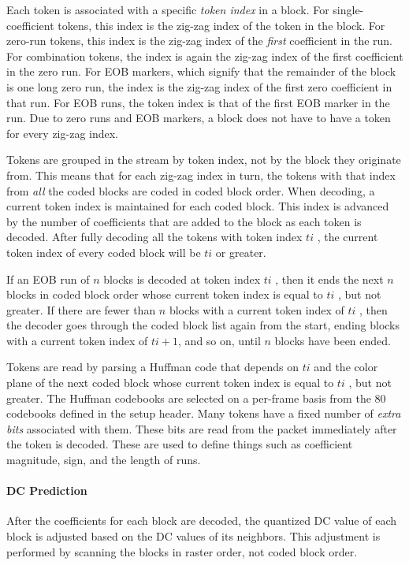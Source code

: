 \documentclass[11pt,letterpaper]{article}
\newcommand{\ti}{\ensuremath{\mathit{ti}} }
\newcommand{\term}[1]{{\em #1}}
\begin{document}
Each token is associated with a specific \term{token index} in a block.
For single-coefficient tokens, this index is the zig-zag index of the token in
 the block.
For zero-run tokens, this index is the zig-zag index of the {\em first}
 coefficient in the run.
For combination tokens, the index is again the zig-zag index of the first
 coefficient in the zero run.
For EOB markers, which signify that the remainder of the block is one long zero
 run, the index is the zig-zag index of the first zero coefficient in that run.
For EOB runs, the token index is that of the first EOB marker in the run.
Due to zero runs and EOB markers, a block does not have to have a token for
 every zig-zag index.

Tokens are grouped in the stream by token index, not by the block they
 originate from.
This means that for each zig-zag index in turn, the tokens with that index from
 {\em all} the coded blocks are coded in coded block order.
When decoding, a current token index is maintained for each coded block.
This index is advanced by the number of coefficients that are added to the
 block as each token is decoded.
After fully decoding all the tokens with token index \ti, the current token
 index of every coded block will be \ti or greater.

If an EOB run of $n$ blocks is decoded at token index \ti, then it ends the
 next $n$ blocks in coded block order whose current token index is equal to
 \ti, but not greater.
If there are fewer than $n$ blocks with a current token index of \ti, then the
 decoder goes through the coded block list again from the start, ending blocks
 with a current token index of $\ti+1$, and so on, until $n$ blocks have been
 ended.

Tokens are read by parsing a Huffman code that depends on \ti and the color
 plane of the next coded block whose current token index is equal to \ti, but
 not greater.
The Huffman codebooks are selected on a per-frame basis from the 80 codebooks
 defined in the setup header.
Many tokens have a fixed number of \term{extra bits} associated with them.
These bits are read from the packet immediately after the token is decoded.
These are used to define things such as coefficient magnitude, sign, and the
 length of runs.

\paragraph{DC Prediction}

After the coefficients for each block are decoded, the quantized DC value of
 each block is adjusted based on the DC values of its neighbors.
This adjustment is performed by scanning the blocks in raster order, not coded
 block order.
\end{document}
